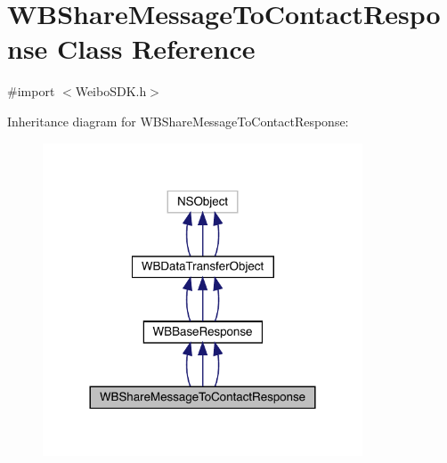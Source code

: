 \hypertarget{interface_w_b_share_message_to_contact_response}{}\section{W\+B\+Share\+Message\+To\+Contact\+Response Class Reference}
\label{interface_w_b_share_message_to_contact_response}


{\ttfamily \#import $<$Weibo\+S\+D\+K.\+h$>$}



Inheritance diagram for W\+B\+Share\+Message\+To\+Contact\+Response\+:\nopagebreak
\begin{figure}[H]
\begin{center}
\leavevmode
\includegraphics[width=269pt]{interface_w_b_share_message_to_contact_response__inherit__graph}
\end{center}
\end{figure}


